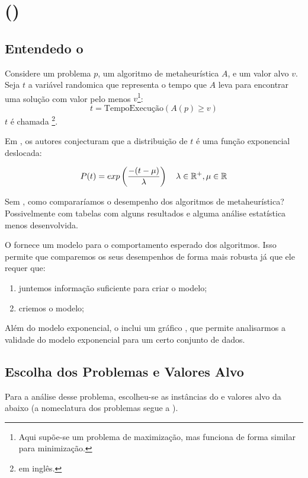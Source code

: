 \section{\tttfull (\ttt)}

\subsection{Entendedo o \ttt}

Considere um problema $p$, um algoritmo de metaheurística $A$, e um valor alvo $v$. Seja $t$ a variável randomica que representa o tempo que $A$ leva para encontrar uma solução com valor pelo menos $v$\footnote{Aqui supõe-se um problema de maximização, mas funciona de forma similar para minimização.}:
\begin{equation}
    t = \mbox{TempoExecução}(A(p) \geqslant v)
\end{equation}
$t$ é chamada \tttvar\footnote{\tttvaren em inglês.}.

Em \cite{bib:ttt}, os autores conjecturam que a distribuição de $t$ é uma função exponencial deslocada:

\begin{equation}
    P(t) = exp\left(\dfrac{-(t-\mu)}{\lambda}\right)
    \quad \lambda \in \mathbb{R}^+, \mu \in \mathbb{R}
\end{equation}

Sem \ttt, como compararíamos o desempenho dos algoritmos de metaheurística? Possivelmente com tabelas com alguns resultados e alguma análise estatística menos desenvolvida.

O \ttt fornece um modelo para o comportamento esperado dos algoritmos. Isso permite que comparemos os seus desempenhos de forma mais robusta já que ele requer que:

\begin{enumerate}
    \item juntemos informação suficiente para criar o modelo;
    \item criemos o modelo;
\end{enumerate}

Além do modelo exponencial, o \ttt inclui um gráfico \qq, que permite analisarmos a validade do modelo exponencial para um certo conjunto de dados.

\subsection{Escolha dos Problemas e Valores Alvo}

Para a análise desse problema, escolheu-se as instâncias do \maxkqbf e valores alvo da  abaixo (a nomeclatura dos problemas segue a ).

